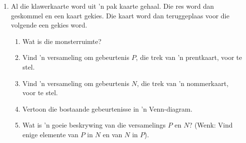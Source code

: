 \begin{eocexercises}{}
\begin{enumerate}[itemsep=5pt, label=\textbf{\arabic*}.]
  \item Al die klawerkaarte word uit 'n pak kaarte gehaal. Die res word dan geskommel en een kaart gekies. Die kaart word dan teruggeplaas voor die volgende een gekies word.
    \begin{enumerate}[noitemsep, label=\textbf{(\alph*)} ]
    \item Wat is die monsterruimte?
    \item Vind 'n versameling om gebeurtenis $P$, die trek van 'n prentkaart, voor te stel.
    \item Vind 'n versameling om gebeurtenis $N$, die trek van 'n nommerkaart, voor te stel.
    \item Vertoon die bostaande gebeurtenisse in 'n Venn-diagram.
    \item Wat is 'n goeie beskrywing van die versamelings $P$ en $N$?
      (Wenk: Vind enige elemente van $P$ in $N$ en van $N$ in $P$).
    \end{enumerate}


\end{enumerate}
\end{eocexercises}
